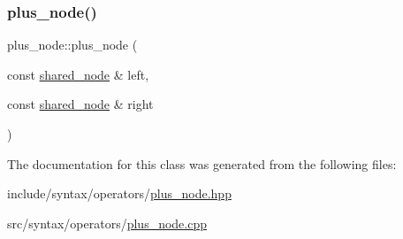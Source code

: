 \subsubsection{\texorpdfstring{plus\+\_\+node()}{plus\_node()}}
{\footnotesize\ttfamily plus\+\_\+node\+::plus\+\_\+node (\begin{DoxyParamCaption}\item[{const \hyperlink{namespacejawe_a3f307481d921b6cbb50cc8511fc2b544}{shared\+\_\+node} \&}]{left,  }\item[{const \hyperlink{namespacejawe_a3f307481d921b6cbb50cc8511fc2b544}{shared\+\_\+node} \&}]{right }\end{DoxyParamCaption})}



The documentation for this class was generated from the following files\+:\begin{DoxyCompactItemize}
\item 
include/syntax/operators/\hyperlink{plus__node_8hpp}{plus\+\_\+node.\+hpp}\item 
src/syntax/operators/\hyperlink{plus__node_8cpp}{plus\+\_\+node.\+cpp}\end{DoxyCompactItemize}
